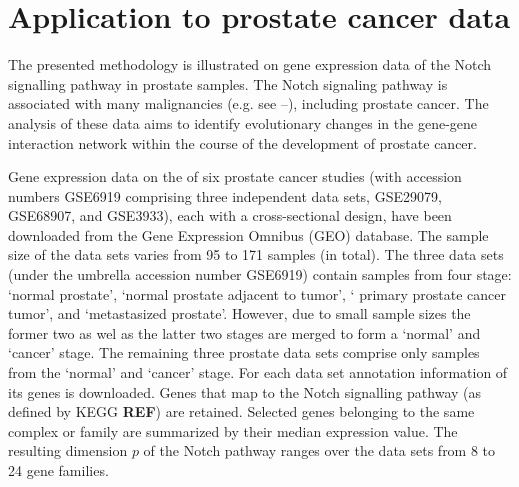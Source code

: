\documentclass[10pt]{article}
\newcommand{\red}[1]{{\textcolor {red} {#1}}}
\begin{document}





\section{Application to prostate cancer data}\label{application}
The presented methodology is illustrated on gene expression data of the Notch signalling pathway in prostate samples. The
Notch signaling pathway is associated with many malignancies (e.g. see \citet{leong2006recent}--\citet{espinoza2013notch}), including prostate cancer. The analysis of these data aims to identify evolutionary changes in the gene-gene interaction network within the course of the development of prostate cancer. 




Gene expression data on the of six prostate cancer studies (with accession numbers GSE6919 comprising three independent data sets,  GSE29079, GSE68907, and GSE3933), each with a cross-sectional design, have been downloaded from the Gene Expression Omnibus (GEO) database. The sample size of the data sets varies from 95 to 171 samples (in total). The three data sets (under the umbrella accession number GSE6919) contain samples from four stage: `normal prostate', `normal prostate adjacent to tumor', ` primary prostate cancer tumor', and `metastasized prostate'. However, due to small sample sizes the former two as wel as the latter two stages are merged to form a `normal'  and `cancer' stage. The remaining three prostate data sets comprise only samples from the `normal'  and `cancer' stage. For each data set annotation information of its genes is downloaded. Genes that map to the Notch signalling pathway (as defined by KEGG \textbf{REF}) are retained. Selected genes belonging to the same complex or family are summarized by their median expression value. The resulting dimension $p$ of the Notch pathway ranges over the data sets from 8 to 24 gene families.
\end{document}
